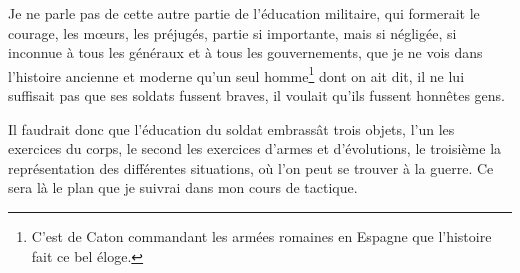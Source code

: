 \documentclass[french,twoside]{book} %
\begin{document}
Je ne parle pas de cette autre partie de l’éducation militaire, qui formerait le courage, les mœurs, les préjugés, partie si importante, mais si négligée, si inconnue à tous les généraux et à tous les gouvernements, que je ne vois dans l’histoire ancienne et moderne qu’un seul homme\footnote{C’est de Caton commandant les armées romaines en Espagne que l’histoire fait ce bel éloge.} dont on ait dit, il ne lui suffisait pas que ses soldats fussent braves, il voulait qu’ils fussent honnêtes gens.\par
Il faudrait donc que l’éducation du soldat embrassât trois objets, l’un les exercices du corps, le second les exercices d’armes et d’évolutions, le troisième la représentation des différentes situations, où l’on peut se trouver à la guerre. Ce sera là le plan que je suivrai dans mon cours de tactique.\par
\end{document}
